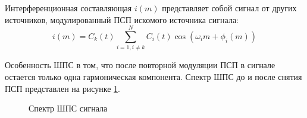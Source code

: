 Интерференционная составляющая ${i(m)}$ представляет собой сигнал от других источников, модулированный ПСП искомого источника сигнала:
\begin{equation}
	\label{eq:cdma_interference}
	i(m) = C_k(t) \sum\limits_{i=1, i \ne k}^{N}C_i(t)\cos{(\omega_{i}m + \phi_i(m))}
\end{equation}

Особенность ШПС в том, что после повторной модуляции ПСП в сигнале остается только одна гармоническая компонента.
Спектр ШПС до и после снятия ПСП представлен на рисунке \ref{pic:gps_spectrum}.

\begin{figure}[H]
	\center{}
	\caption{Спектр ШПС сигнала}
	\label{pic:gps_spectrum}
\end{figure}
